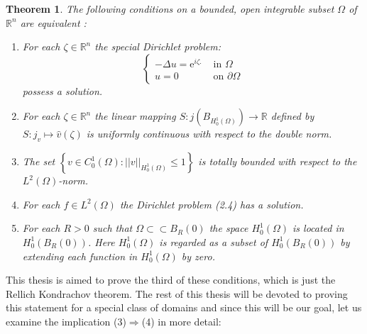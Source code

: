 \documentclass[11pt,a4paper,leqno]{report}
\newtheorem{theorem}{Theorem}[chapter]
\numberwithin{equation}{chapter}
\begin{document}
\begin{theorem} The following conditions on a bounded, open integrable subset $\Omega$ of $\mathbb{R}^n$ are equivalent \cite[Theorem 1]{CWSDP}:
\begin{enumerate}
\item{For each $\zeta\in\mathbb{R}^n$ the special Dirichlet problem:
\begin{equation}\begin{cases} -\Delta u =\mathrm{e}^{i\zeta .}&\text{ in }\Omega\\u=0&\text{ on }\partial\Omega
\end{cases}\end{equation}
possess a solution.}
\item{For each $\zeta\in\mathbb{R}^n$ the linear mapping $S:j(B_{H^1_0(\Omega)})\rightarrow \mathbb{R}$ defined by $S:j_v\mapsto \hat{v}(\zeta)$ is uniformly continuous with respect to the double norm.}
\item{The set $\left\{v\in C^1_0(\Omega):||v||_{H^1_0(\Omega)}\leq 1\right\}$ is totally bounded with respect to the $L^2(\Omega)$-norm.}
\item{For each $f\in L^2(\Omega)$ the Dirichlet problem (2.4) has a solution.}
\item{For each $R>0$ such that $\Omega\subset\subset B_R(0)$ the space $H^1_0(\Omega)$ is located in $H^1_0(B_R(0))$. Here $H^1_0(\Omega)$ is regarded as a subset of $H^1_0(B_R(0))$ by extending each function in $H^1_0(\Omega)$ by zero.}
\end{enumerate}
\end{theorem}
This thesis is aimed to prove the third of these conditions, which is just the Rellich Kondrachov theorem. The rest of this thesis will be devoted to proving this statement for a special class of domains and since this will be our goal, let us examine the implication (3)$\Rightarrow$(4) in more detail: 
\end{document}
